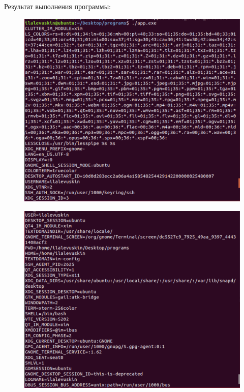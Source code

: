 \documentclass[a4paper,12pt]{article}
\begin{document}
	\newpage
	
	Результат выполнения программы:
	
	\begin{figure}[h!]
		\begin{center}
			{\includegraphics[scale = 0.6]{round1.png}}
			\label{ris:round1}
		\end{center}
	\end{figure}

	\begin{figure}[h!]
		\begin{center}
			{\includegraphics[scale = 0.55]{round2.png}}
			\label{ris:round2}
		\end{center}
	\end{figure}
\end{document}
